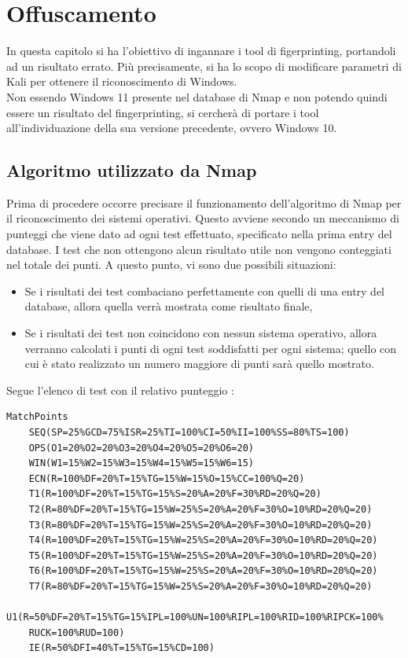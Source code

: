 \chapter{Offuscamento}

In questa capitolo si ha l'obiettivo di ingannare i tool di figerprinting, portandoli ad un risultato errato. Più precisamente, si ha lo scopo di modificare parametri di Kali per ottenere il riconoscimento di Windows.
\\
Non essendo Windows 11 presente nel database di Nmap e non potendo quindi essere un risultato del fingerprinting, si cercherà di portare i tool all'individuazione della sua versione precedente, ovvero Windows 10.

\section{Algoritmo utilizzato da Nmap} \label{algoritmi}
Prima di procedere occorre precisare il funzionamento dell'algoritmo di Nmap per il riconoscimento dei sistemi operativi. Questo avviene secondo un meccanismo di punteggi che viene dato ad ogni test effettuato, specificato nella prima entry del database. I test che non ottengono alcun risultato utile non vengono conteggiati nel totale dei punti.
A questo punto, vi sono due possibili situazioni:
\begin{itemize}
	\item Se i risultati dei test combaciano perfettamente con quelli di una entry del database, allora quella verrà mostrata come risultato finale,
	\item Se i risultati dei test non coincidono con nessun sistema operativo, allora verranno calcolati i punti di ogni test soddisfatti per ogni sistema; quello con cui è stato realizzato un numero maggiore di punti sarà quello mostrato.
\end{itemize}

Segue l'elenco di test con il relativo punteggio \cite{punti_nmap}:

\begin{lstlisting}[caption={Punteggi che Nmap attrribuisce ad ogni test}]
	MatchPoints
	SEQ(SP=25%GCD=75%ISR=25%TI=100%CI=50%II=100%SS=80%TS=100)
	OPS(O1=20%O2=20%O3=20%O4=20%O5=20%O6=20)
	WIN(W1=15%W2=15%W3=15%W4=15%W5=15%W6=15)
	ECN(R=100%DF=20%T=15%TG=15%W=15%O=15%CC=100%Q=20)
	T1(R=100%DF=20%T=15%TG=15%S=20%A=20%F=30%RD=20%Q=20)
	T2(R=80%DF=20%T=15%TG=15%W=25%S=20%A=20%F=30%O=10%RD=20%Q=20)
	T3(R=80%DF=20%T=15%TG=15%W=25%S=20%A=20%F=30%O=10%RD=20%Q=20)
	T4(R=100%DF=20%T=15%TG=15%W=25%S=20%A=20%F=30%O=10%RD=20%Q=20)
	T5(R=100%DF=20%T=15%TG=15%W=25%S=20%A=20%F=30%O=10%RD=20%Q=20)
	T6(R=100%DF=20%T=15%TG=15%W=25%S=20%A=20%F=30%O=10%RD=20%Q=20)
	T7(R=80%DF=20%T=15%TG=15%W=25%S=20%A=20%F=30%O=10%RD=20%Q=20)
	U1(R=50%DF=20%T=15%TG=15%IPL=100%UN=100%RIPL=100%RID=100%RIPCK=100%
	RUCK=100%RUD=100)
	IE(R=50%DFI=40%T=15%TG=15%CD=100)
\end{lstlisting}

